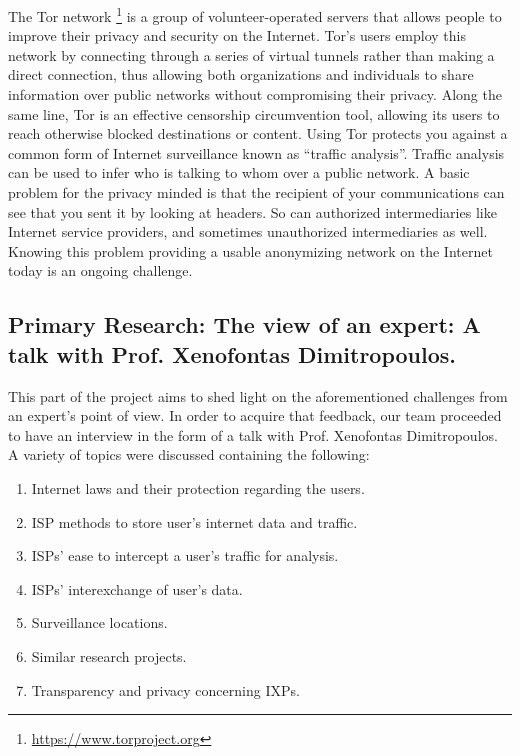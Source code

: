 The Tor network \footnote{\url{https://www.torproject.org}} is a group of 
volunteer-operated servers that allows people to 
improve their privacy and security on the Internet. Tor's users employ this 
network by connecting through a series of virtual tunnels rather than making a 
direct connection, thus allowing both organizations and individuals to share 
information over public networks without compromising their privacy. Along the 
same line, Tor is an effective censorship circumvention tool, allowing its users 
to reach otherwise blocked destinations or content.
Using Tor protects you against a common form of Internet surveillance known as 
``traffic analysis''. Traffic analysis can be used to infer who is talking to 
whom over a public network.
A basic problem for the privacy minded is that the recipient of your 
communications can see that you sent it by looking at headers. So can authorized 
intermediaries like Internet service providers, and sometimes unauthorized 
intermediaries as well.
Knowing this problem providing a usable anonymizing network on the Internet 
today is an ongoing challenge. 

\vspace{1cm}
\subsection{Primary Research: The view of an expert: A talk with  Prof. 
Xenofontas Dimitropoulos.}
\vspace{0.7cm}

This part of the project aims to shed light on the aforementioned challenges 
from an expert's point of view. In order to acquire that feedback, our team 
proceeded to have an interview in the form of a talk with Prof. Xenofontas 
Dimitropoulos. A variety of topics were discussed containing the following:
\begin{enumerate}
\item{Internet laws and their protection regarding the users.}
\item{ISP methods to store user's internet data and traffic.}
\item{ISPs' ease to intercept a user's traffic for analysis.}
\item{ISPs' interexchange of user's data.}
\item{Surveillance locations.}
\item{Similar research projects.} 
\item{Transparency and privacy concerning IXPs.}
\end{enumerate}

